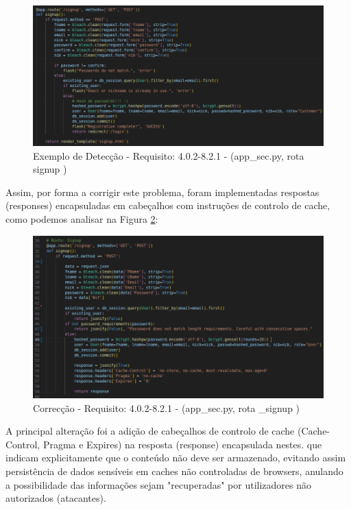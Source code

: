 \begin{figure}[H]
      \centering
      \includegraphics[width=16cm]{images/Detecção_8_2_1.png}
      \caption{Exemplo de Detecção - Requisito: 4.0.2-8.2.1 - (app\_sec.py, rota signup )}
      \label{fig:det8.2.1}
\end{figure}


Assim, por forma a corrigir este problema, foram implementadas respostas (responses) encapsuladas em cabeçalhos com instruções de controlo de cache, como podemos analisar na Figura \ref{fig:cor8.2.1}:


\begin{figure}[H]
      \centering
      \includegraphics[width=16cm]{images/Correcção_8_2_1.png}
      \caption{Correcção - Requisito: 4.0.2-8.2.1 - (app\_sec.py, rota \_signup )}
      \label{fig:cor8.2.1}
\end{figure}

A principal alteração foi a adição de cabeçalhos de controlo de cache (Cache-Control, Pragma e Expires) na resposta (response) encapsulada nestes. que indicam explicitamente que o conteúdo não deve ser armazenado, evitando assim persistência de dados sensíveis em caches não controladas de browsers, anulando a possibilidade das informações sejam "recuperadas" por utilizadores não autorizados (atacantes).

